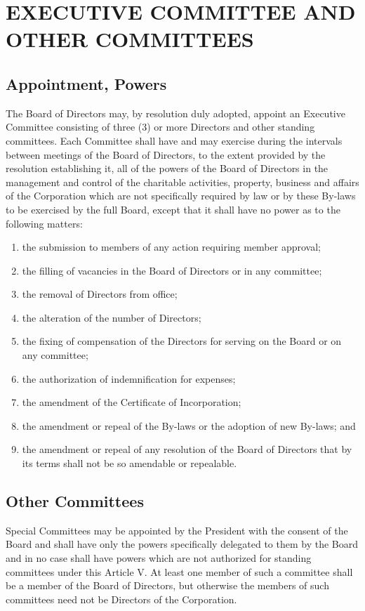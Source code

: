\documentclass{article}
\begin{document}
\section{EXECUTIVE COMMITTEE AND OTHER COMMITTEES}
\subsection{Appointment, Powers}
The Board of Directors may, by resolution duly adopted, appoint an Executive Committee consisting of three (3) or more Directors and other standing committees.  Each Committee shall have and may exercise during the intervals between meetings of the Board of Directors, to the extent provided by the resolution establishing it, all of the powers of the Board of Directors in the management and control of the charitable activities, property, business and affairs of the Corporation which are not specifically required by law or by these By-laws to be exercised by the full Board, except that it shall have no power as to the following matters:
\renewcommand{\labelenumi}{\alph{enumi}$)$}
\begin{enumerate}
\item the submission to members of any action requiring member approval;
\item the filling of vacancies in the Board of Directors or in any committee;
\item the removal of Directors from office;
\item the alteration of the number of Directors;
\item the fixing of compensation of the Directors for serving on the Board or on any committee;
\item the authorization of indemnification for expenses;
\item the amendment of the Certificate of Incorporation;
\item the amendment or repeal of the By-laws or the adoption of new By-laws; and
\item the amendment or repeal of any resolution of the Board of Directors that by its terms shall not be so amendable or repealable.
\end{enumerate}
\subsection{Other Committees}
Special Committees may be appointed by the President with the consent of the Board and shall have only the powers specifically delegated to them by the Board and in no case shall have powers which are not authorized for standing committees under this Article V.  At least one member of such a committee shall be a member of the Board of Directors, but otherwise the members of such committees need not be Directors of the Corporation.
\end{document}
